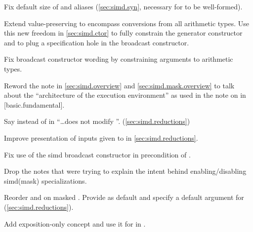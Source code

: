 \begin{revision}
\item Fix default size of  and  aliases
  (\ref{sec:simd.syn}, necessary for
  \std{} to be well-formed).
\item Extend value-preserving to encompass conversions from all arithmetic
  types. Use this new freedom in \ref{sec:simd.ctor} to fully constrain the
  generator constructor and to plug a specification hole in the broadcast
  constructor.
\item Fix broadcast constructor wording by constraining \constexprwrapperlike
  arguments to arithmetic types.
\item Reword the note in \ref{sec:simd.overview} and
  \ref{sec:simd.mask.overview} to talk about the “architecture of the execution
  environment” as used in the note on  in [basic.fundamental].
\item Say  instead of  in “\ldots does
  not modify ”. (\ref{sec:simd.reductions})
\item Improve presentation of inputs given to
   in \ref{sec:simd.reductions}.
\item Fix use of the simd broadcast constructor in precondition of
  .
\item Drop the notes that were trying to explain the intent behind
  enabling/disabling simd(mask) specializations.
\item Reorder  and  on masked
  . Provide  as default 
  and specify a default argument for 
  (\ref{sec:simd.reductions}).
\item Add exposition-only concept \reductionoperation and use it for
   in .

\end{revision}
